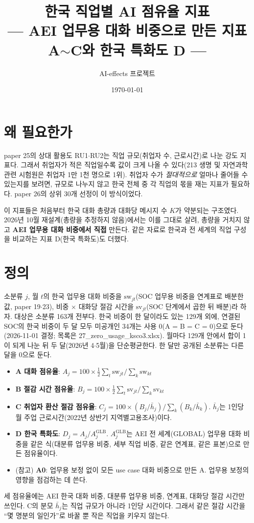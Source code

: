 \documentclass[11pt]{article}
\title{한국 직업별 AI 점유율 지표\\[2mm]
\large --- AEI 업무용 대화 비중으로 만든 지표 A$\sim$C와 한국 특화도 D ---}
\author{AI-effects 프로젝트}
\date{\today}
\begin{document}
\maketitle

\section{왜 필요한가}

paper 25의 상대 활용도 RU1$\cdot$RU2는 직업 규모(취업자 수, 근로시간)로 나눈 강도 지표다. 그래서 취업자가 적은 직업일수록 값이 크게 나올 수 있다(213 생명 및 자연과학 관련 시험원은 취업자 1만 1천 명으로 1위). 취업자 수가 \emph{절대적으로} 얼마나 줄어들 수 있는지를 보려면, 규모로 나누지 않고 한국 전체 중 각 직업의 몫을 재는 지표가 필요하다. paper 26의 상위 30개 선정이 이 방식이었다.

이 지표들은 처음부터 한국 대화 총량과 대화당 메시지 수 $K$가 약분되는 구조였다. 2026년 10월 재설계(총량을 추정하지 않음)에서는 이를 그대로 살려, 총량을 거치지 않고 \textbf{AEI 업무용 대화 비중에서 직접} 만든다. 같은 자료로 한국과 전 세계의 직업 구성을 비교하는 지표 D(한국 특화도)도 더했다.

\section{정의}

소분류 $j$, 월 $t$의 한국 업무용 대화 비중을 $\mathrm{sw}_{jt}$(SOC 업무용 비중을 연계표로 배분한 값, paper 19$\cdot$23), 비중 $\times$ 대화당 절감 시간을 $\mathrm{sv}_{jt}$(SOC 단계에서 곱한 뒤 배분)라 하자. 대상은 소분류 163개 전부다. 한국 비중이 한 달이라도 있는 129개 외에, 연결된 SOC의 한국 비중이 두 달 모두 미공개인 34개는 사용 0(A = B = C = 0)으로 둔다(2026-11-01 결정; 목록은 27\_zero\_usage\_ksco3.xlsx). 월마다 129개 안에서 합이 1이 되게 나눈 뒤 두 달(2026년 4$\cdot$5월)을 단순평균한다. 한 달만 공개된 소분류는 다른 달을 0으로 둔다.
\begin{itemize}[leftmargin=*]
  \item \textbf{A 대화 점유율}: $A_j = 100 \times \tfrac12 \sum_t \mathrm{sw}_{jt} / \sum_k \mathrm{sw}_{kt}$
  \item \textbf{B 절감 시간 점유율}: $B_j = 100 \times \tfrac12 \sum_t \mathrm{sv}_{jt} / \sum_k \mathrm{sv}_{kt}$
  \item \textbf{C 취업자 환산 절감 점유율}: $C_j = 100 \times (B_j/\bar h_j) / \sum_k (B_k/\bar h_k)$. $\bar h_j$는 1인당 월 주업 근로시간(2022년 상반기 지역별고용조사)이다.
  \item \textbf{D 한국 특화도}: $D_j = A_j / A^{\text{GLB}}_j$. $A^{\text{GLB}}_j$는 AEI 전 세계(GLOBAL) 업무용 대화 비중을 같은 식(대분류 업무용 비중, 세부 직업 비중, 같은 연계표, 같은 표본)으로 만든 점유율이다.
  \item (참고) \textbf{A0}: 업무용 보정 없이 모든 use case 대화 비중으로 만든 A. 업무용 보정의 영향을 점검하는 데 쓴다.
\end{itemize}
세 점유율에는 AEI 한국 대화 비중, 대분류 업무용 비중, 연계표, 대화당 절감 시간만 쓰인다. C의 분모 $\bar h_j$는 직업 규모가 아니라 1인당 시간이다. 그래서 같은 절감 시간을 ``몇 명분의 일인가''로 바꿀 뿐 작은 직업을 키우지 않는다.
\end{document}
